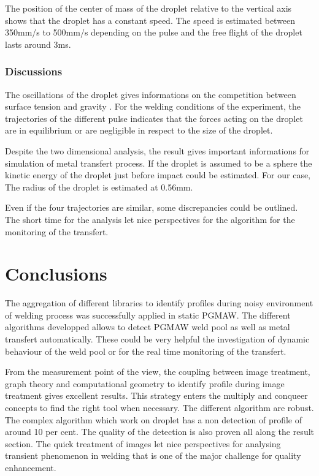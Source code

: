 \documentclass[12pt]{iopart}
\begin{document}
The position of the center of mass of the droplet relative to the vertical axis shows that the 
droplet has a constant speed. The speed is estimated between 350mm/s to 500mm/s depending on the pulse
and the free flight of the droplet lasts around  3ms.

\subsubsection{Discussions}
The oscillations of the droplet gives informations on the competition between surface tension and gravity
\cite{White}.
For the welding conditions of the experiment, the trajectories of the different pulse indicates 
that the forces acting on the droplet are in equilibrium
or are negligible in respect to the size of the droplet.

Despite the two dimensional analysis, the result gives important informations for 
simulation of metal transfert process. If  the droplet is assumed to be a sphere
 the kinetic energy of the droplet just before impact could be estimated. For our case,
The radius of the droplet is estimated at 0.56mm. %

Even if the four trajectories are similar, some discrepancies could be outlined. The short time 
for the analysis let nice perspectives for the algorithm for the monitoring of the transfert.


\section{ Conclusions}
The aggregation of different libraries to identify profiles during noisy environment of welding process
was successfully applied in static PGMAW. The different algorithms developped allows to detect PGMAW weld pool
as well as metal transfert automatically. These could be very helpful the investigation of dynamic behaviour
of the weld pool or for the real time monitoring of the transfert. 

From the measurement point of the view, the
coupling between image treatment, graph theory and computational
 geometry to identify profile during image treatment
gives excellent results. 
This strategy enters the multiply and conqueer concepts
to find the right tool when necessary.
 The different algorithm are robust. The complex algorithm which work on droplet
has a non detection of profile of around 10 per cent.
The quality of the detection is also proven all along the result section. 
The quick treatment of images let nice perspectives for analysing transient phenomenon in welding 
 that is one of the major challenge for quality enhancement.
\end{document}
